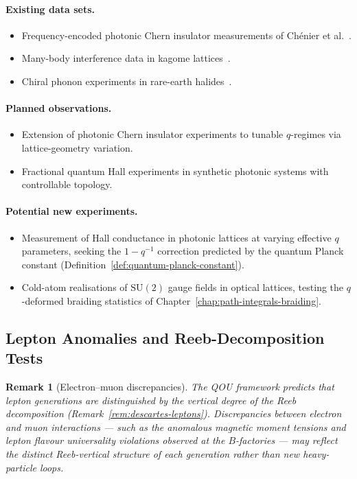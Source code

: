 \documentclass[12pt,a4paper]{report}
\newtheorem{remark}[theorem]{Remark}
\begin{document}
\paragraph{Existing data sets.}
\begin{itemize}
  \item Frequency-encoded photonic Chern insulator measurements of
        Ch\'enier et al.~\cite{chenier2026}.
  \item Many-body interference data in kagome lattices~\cite{guo2025}.
  \item Chiral phonon experiments in rare-earth halides~\cite{luo2023}.
\end{itemize}

\paragraph{Planned observations.}
\begin{itemize}
  \item Extension of photonic Chern insulator experiments to tunable
        $q$-regimes via lattice-geometry variation.
  \item Fractional quantum Hall experiments in synthetic photonic systems
        with controllable topology.
\end{itemize}

\paragraph{Potential new experiments.}
\begin{itemize}
  \item Measurement of Hall conductance in photonic lattices at varying
        effective $q$ parameters, seeking the $1 - q^{-1}$ correction predicted
        by the quantum Planck constant
        (Definition~\ref{def:quantum-planck-constant}).
  \item Cold-atom realisations of $\mathrm{SU}(2)$ gauge fields in optical
        lattices, testing the $q$-deformed braiding statistics of
        Chapter~\ref{chap:path-integrals-braiding}.
\end{itemize}

\subsection{Lepton Anomalies and Reeb-Decomposition Tests}
\label{sec:lepton-anomalies}

\begin{remark}[Electron--muon discrepancies]
\label{rem:lepton-discrepancies}
The QOU framework predicts that lepton generations are distinguished by the
vertical degree of the Reeb decomposition
(Remark~\ref{rem:descartes-leptons}).  Discrepancies between electron and muon
interactions --- such as the anomalous magnetic moment tensions and lepton
flavour universality violations observed at the $B$-factories --- may reflect
the distinct Reeb-vertical structure of each generation rather than new
heavy-particle loops.
\end{remark}
\end{document}
